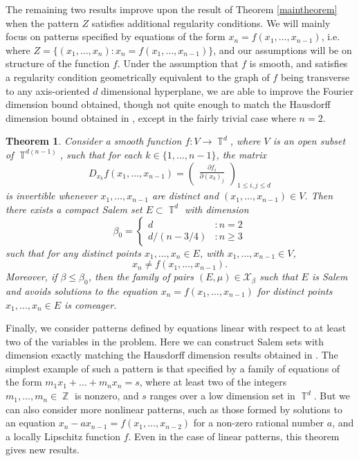 \documentclass[dvipsnames,letterpaper,12pt]{article}
\numberwithin{equation}{section}
\DeclareMathOperator{\ZZ}{\mathbb{Z}}
\DeclareMathOperator{\TT}{\mathbb{T}}
\newtheorem{theorem}{Theorem}
\numberwithin{theorem}{section}
\begin{document}
The remaining two results improve upon the result of Theorem \ref{maintheorem} when the pattern $Z$ satisfies additional regularity conditions. We will mainly focus on patterns specified by equations of the form $x_n = f(x_1,\dots,x_{n-1})$, i.e. where $Z = \{ (x_1,\dots,x_n): x_n = f(x_1,\dots,x_{n-1}) \}$, and our assumptions will be on structure of the function $f$. Under the assumption that $f$ is smooth, and satisfies a regularity condition geometrically equivalent to the graph of $f$ being transverse to any axis-oriented $d$ dimensional hyperplane, we are able to improve the Fourier dimension bound obtained, though not quite enough to match the Hausdorff dimension bound obtained in \cite{PramanikFraser}, except in the fairly trivial case where $n = 2$.

\begin{theorem} \label{theoremJOICVIOJVI122}
    Consider a smooth function $f: V \to \TT^d$, where $V$ is an open subset of $\TT^{d(n-1)}$, such that for each $k \in \{ 1, \dots, n-1 \}$, the matrix
    \[ D_{x_k} f(x_1,\dots,x_{n-1}) = \begin{pmatrix} \frac{\partial f_i}{\partial (x_k)_j} \end{pmatrix}_{1 \leq i,j \leq d} \]
    is invertible whenever $x_1,\dots,x_{n-1}$ are distinct and $(x_1,\dots,x_{n-1}) \in V$. Then there exists a compact Salem set $E \subset \TT^d$ with dimension
    \[ \beta_0 = \begin{cases} d &: n = 2 \\ d/(n - 3/4) &: n \geq 3 \end{cases} \]
    such that for any distinct points $x_1, \dots, x_n \in E$, with $x_1,\dots,x_{n-1} \in V$,
    \[ x_n \neq f(x_1,\dots,x_{n-1}). \]
    Moreover, if $\beta \leq \beta_0$, then the family of pairs $(E,\mu) \in \mathcal{X}_\beta$ such that $E$ is Salem and avoids solutions to the equation $x_n = f(x_1,\dots,x_{n-1})$ for distinct points $x_1,\dots,x_n \in E$ is comeager.
\end{theorem}

Finally, we consider patterns defined by equations linear with respect to at least two of the variables in the problem. Here we can construct Salem sets with dimension exactly matching the Hausdorff dimension results obtained in \cite{OurPaper}. The simplest example of such a pattern is that specified by a family of equations of the form $m_1x_1 + \dots + m_nx_n = s$, where at least two of the integers $m_1,\dots,m_n \in \ZZ$ is nonzero, and $s$ ranges over a low dimension set in $\TT^d$. But we can also consider more nonlinear patterns, such as those formed by solutions to an equation $x_n - a x_{n-1} = f(x_1,\dots,x_{n-2})$ for a non-zero rational number $a$, and a locally Lipschitz function $f$. Even in the case of linear patterns, this theorem gives new results.
\end{document}
